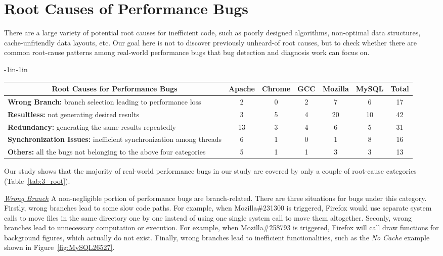 




\section{Root Causes of Performance Bugs}
\label{sec:3_root}

There are a large variety of potential root causes for inefficient code, 
such as poorly designed algorithms, non-optimal data structures, cache-unfriendly data layouts, etc. 
Our goal here is not to discover previously unheard-of root causes, 
but to check whether there are common root-cause patterns among 
real-world performance bugs that bug detection and diagnosis work can focus on.

\begin{table*}[tb!]
\begin{adjustwidth}{-1in}{-1in}
\scriptsize
\centering
{

\begin{tabular}{lcccccc}
\toprule
\multicolumn{1}{c}{\bf Root Causes for Performance Bugs} &Apache&Chrome&GCC&Mozilla&MySQL&Total\\
\midrule
\multicolumn{1}{l}{{\bf Wrong Branch:} branch selection leading to performance loss}
&2&0&2&7&6&17\\
\midrule
\multicolumn{1}{l}{{\bf Resultless:} not generating desired results}
&3&5&4&20&10&42\\
\midrule
\multicolumn{1}{l}{{\bf Redundancy:} generating the same results repeatedly}
&13&3&4&6&5&31\\
\midrule
\multicolumn{1}{l}{{\bf Synchronization Issues:} inefficient synchronization among threads}
&6&1&0&1&8&16\\
\midrule
\multicolumn{1}{l}{{\bf Others:} all the bugs not belonging to the above four categories}
&5&1&1&3&3&13\\
\bottomrule

\end{tabular}
}
\end{adjustwidth}
\caption{Root cause categorization in Section~\ref{sec:3_root}}
\label{tab:3_root}
\end{table*}

Our study shows that the majority of real-world performance bugs in our study 
are covered by only a couple of root-cause categories (Table~\ref{tab:3_root}).

\underline{\it Wrong Branch} 
A non-negligible portion of performance bugs are branch-related.
There are three situations for bugs under this category. 
Firstly, wrong branches lead to some slow code paths. 
For example, when Mozilla\#231300 is triggered, 
Firefox would use separate system calls to move files 
in the same directory one by one instead of using one single system call to move them altogether. 
Seconly, wrong branches lead to unnecessary computation or execution. 
For example, when Mozilla\#258793 is triggered, 
Firefox will call draw functions for background figures, which actually do not exist. 
Finally, wrong branches lead to inefficient functionalities,
such as the {\it No Cache} example shown in Figure~\ref{fig:MySQL26527}. 

